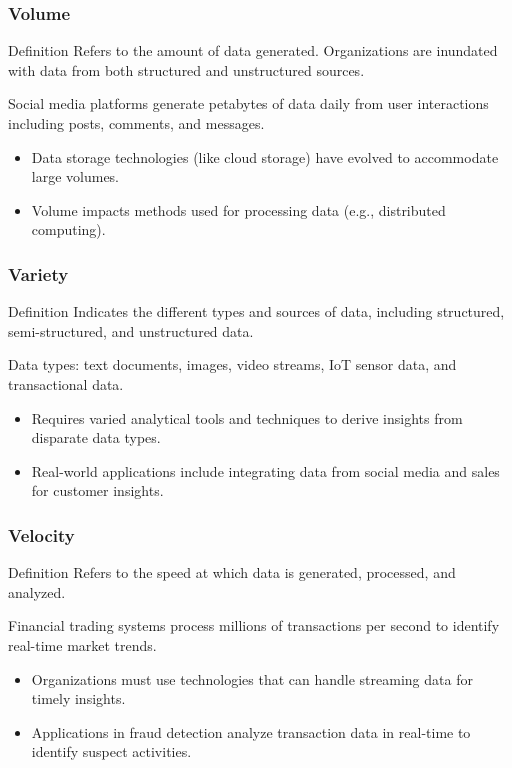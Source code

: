\documentclass[aspectratio=169]{beamer}
\begin{document}
\begin{frame}[fragile]
    \frametitle{Volume}
    \begin{block}{Definition}
        Refers to the amount of data generated. Organizations are inundated with data from both structured and unstructured sources.
    \end{block}
    \begin{example}
        Social media platforms generate petabytes of data daily from user interactions including posts, comments, and messages.
    \end{example}
    \begin{itemize}
        \item Data storage technologies (like cloud storage) have evolved to accommodate large volumes.
        \item Volume impacts methods used for processing data (e.g., distributed computing).
    \end{itemize}
\end{frame}

\begin{frame}[fragile]
    \frametitle{Variety}
    \begin{block}{Definition}
        Indicates the different types and sources of data, including structured, semi-structured, and unstructured data.
    \end{block}
    \begin{example}
        Data types: text documents, images, video streams, IoT sensor data, and transactional data.
    \end{example}
    \begin{itemize}
        \item Requires varied analytical tools and techniques to derive insights from disparate data types.
        \item Real-world applications include integrating data from social media and sales for customer insights.
    \end{itemize}
\end{frame}

\begin{frame}[fragile]
    \frametitle{Velocity}
    \begin{block}{Definition}
        Refers to the speed at which data is generated, processed, and analyzed.
    \end{block}
    \begin{example}
        Financial trading systems process millions of transactions per second to identify real-time market trends.
    \end{example}
    \begin{itemize}
        \item Organizations must use technologies that can handle streaming data for timely insights.
        \item Applications in fraud detection analyze transaction data in real-time to identify suspect activities.
    \end{itemize}
\end{frame}
\end{document}
